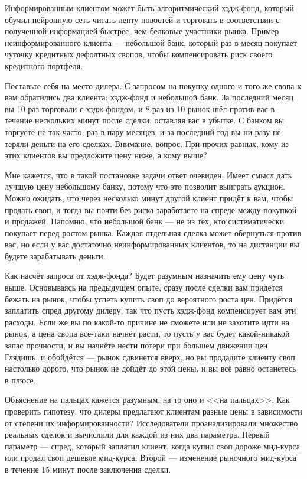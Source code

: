 Информированным клиентом может быть алгоритмический хэдж-фонд, который обучил
нейронную сеть читать ленту новостей и торговать в соответствии с полученной
информацией быстрее, чем белковые участники рынка. Пример неинформированного
клиента --- небольшой банк, который раз в месяц покупает чуточку кредитных
дефолтных свопов, чтобы компенсировать риск своего кредитного портфеля.

Поставьте себя на место дилера. С запросом на покупку одного и того же свопа к
вам обратились два клиента: хэдж-фонд и небольшой банк. За последний месяц вы 10
раз торговали с хэдж-фондом, и 8 раз из 10 рынок шёл против вас в течение
нескольких минут после сделки, оставляя вас в убытке. С банком вы торгуете не
так часто, раз в пару месяцев, и за последний год вы ни разу не теряли деньги на
его сделках. Внимание, вопрос. При прочих равных, кому из этих клиентов вы
предложите цену ниже, а кому выше?
 
Мне кажется, что в такой постановке задачи ответ очевиден. Имеет смысл дать
лучшую цену небольшому банку, потому что это позволит выиграть аукцион. Можно
ожидать, что через несколько минут другой клиент придёт к вам, чтобы продать
своп, и тогда вы почти без риска заработаете на спреде между покупкой и
продажей. Напомню, что небольшой банк --- не из тех, кто систематически покупает
перед ростом рынка. Каждая отдельная сделка может обернуться против вас, но если
у вас достаточно неинформированных клиентов, то на дистанции вы будете
зарабатывать деньги.

Как насчёт запроса от хэдж-фонда? Будет разумным назначить ему цену чуть выше.
Основываясь на предыдущем опыте, сразу после сделки вам придётся бежать на
рынок, чтобы успеть купить своп до вероятного роста цен. Придётся заплатить
спред другому дилеру, так что пусть хэдж-фонд компенсирует вам эти расходы. Если
же вы по какой-то причине не сможете или не захотите идти на рынок, а цена свопа
всё-таки начнёт расти, то пусть у вас будет какой-никакой запас прочности, и вы
начнёте нести потери при большем движении цен. Глядишь, и обойдётся --- рынок
сдвинется вверх, но вы продадите клиенту своп настолько дорого, что рынок не
дойдёт до этой цены, и вы всё равно останетесь в плюсе.

Объяснение на пальцах кажется разумным, на то оно и <<на пальцах>>. Как
проверить гипотезу, что дилеры предлагают клиентам разные цены в зависимости от
степени их информированности? Исследователи проанализировали множество реальных
сделок и вычислили для каждой из них два параметра. Первый параметр --- спред,
который заплатил клиент, когда купил своп дороже мид-курса или продал своп
дешевле мид-курса. Второй --- изменение рыночного мид-курса в течение 15 минут
после заключения сделки.


